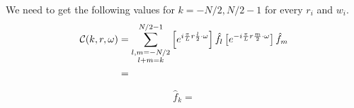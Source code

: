 \documentclass[11pt]{amsart}
\begin{document}
\color{black}
We need to get the following values for $k = -N/2, N/2-1$ for every $r_i$ and $w_i$. 
\begin{align}
\begin{split}
\mathcal{C}(k, r, \omega)  &= \sum_{\substack{l,m=-N/2\\l+m=k}}^{N/2-1} \left[ e^{i{\pi \over L} r {l\over 2}\cdot \omega } \right] \hat{f}_l  \left[ e^{-i{\pi \over L} r {m\over 2}\cdot \omega } \right] \hat{f}_m \\
&= 
\end{split}
\end{align}
 

\begin{equation}
\hat f_k = 
\end{equation}



 

%

\end{document}
